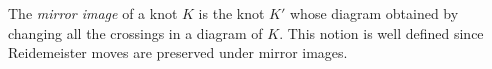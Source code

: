 \documentclass[12pt]{article}
\begin{document}
The \emph{mirror image} of a knot $K$ is the knot $K'$ whose diagram obtained by changing all the crossings in a diagram of $K$. This notion is well defined since
Reidemeister moves are preserved under mirror images.

\end{document}
